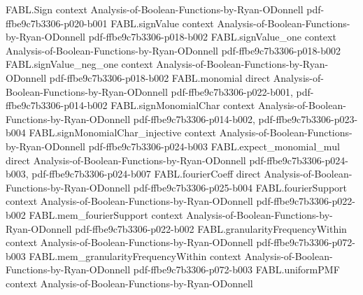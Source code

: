 \begin{theorem}
\label{FABL.normalizedCorrelatedPairSum_second_secondMoment}
\leanok
{}
\proofstep
  {FABL.Sign}
  {context}
  {Analysis-of-Boolean-Functions-by-Ryan-ODonnell}
  {pdf-ffbe9c7b3306-p020-b001}
\proofstep
  {FABL.signValue}
  {context}
  {Analysis-of-Boolean-Functions-by-Ryan-ODonnell}
  {pdf-ffbe9c7b3306-p018-b002}
\proofstep
  {FABL.signValue_one}
  {context}
  {Analysis-of-Boolean-Functions-by-Ryan-ODonnell}
  {pdf-ffbe9c7b3306-p018-b002}
\proofstep
  {FABL.signValue_neg_one}
  {context}
  {Analysis-of-Boolean-Functions-by-Ryan-ODonnell}
  {pdf-ffbe9c7b3306-p018-b002}
\proofstep
  {FABL.monomial}
  {direct}
  {Analysis-of-Boolean-Functions-by-Ryan-ODonnell}
  {pdf-ffbe9c7b3306-p022-b001,
    pdf-ffbe9c7b3306-p014-b002}
\proofstep
  {FABL.signMonomialChar}
  {context}
  {Analysis-of-Boolean-Functions-by-Ryan-ODonnell}
  {pdf-ffbe9c7b3306-p014-b002,
    pdf-ffbe9c7b3306-p023-b004}
\proofstep
  {FABL.signMonomialChar_injective}
  {context}
  {Analysis-of-Boolean-Functions-by-Ryan-ODonnell}
  {pdf-ffbe9c7b3306-p024-b003}
\proofstep
  {FABL.expect_monomial_mul}
  {direct}
  {Analysis-of-Boolean-Functions-by-Ryan-ODonnell}
  {pdf-ffbe9c7b3306-p024-b003,
    pdf-ffbe9c7b3306-p024-b007}
\proofstep
  {FABL.fourierCoeff}
  {direct}
  {Analysis-of-Boolean-Functions-by-Ryan-ODonnell}
  {pdf-ffbe9c7b3306-p025-b004}
\proofstep
  {FABL.fourierSupport}
  {context}
  {Analysis-of-Boolean-Functions-by-Ryan-ODonnell}
  {pdf-ffbe9c7b3306-p022-b002}
\proofstep
  {FABL.mem_fourierSupport}
  {context}
  {Analysis-of-Boolean-Functions-by-Ryan-ODonnell}
  {pdf-ffbe9c7b3306-p022-b002}
\proofstep
  {FABL.granularityFrequencyWithin}
  {context}
  {Analysis-of-Boolean-Functions-by-Ryan-ODonnell}
  {pdf-ffbe9c7b3306-p072-b003}
\proofstep
  {FABL.mem_granularityFrequencyWithin}
  {context}
  {Analysis-of-Boolean-Functions-by-Ryan-ODonnell}
  {pdf-ffbe9c7b3306-p072-b003}
\proofstep
  {FABL.uniformPMF}
  {context}
  {Analysis-of-Boolean-Functions-by-Ryan-ODonnell}

\end{theorem}
